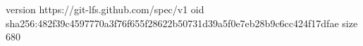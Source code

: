 version https://git-lfs.github.com/spec/v1
oid sha256:482f39c4597770a3f76f655f28622b50731d39a5f0e7eb28b9c6cc424f17dfae
size 680
